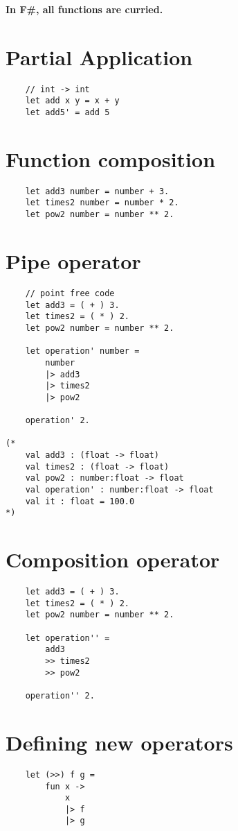 \documentclass[a4paper,11pt]{article}
\begin{document}
\textbf{In F\#, all functions are curried.}

\section{Partial Application}
\begin{lstlisting}
    // int -> int
    let add x y = x + y
    let add5' = add 5
\end{lstlisting}

\section{Function composition}
\begin{lstlisting}
    let add3 number = number + 3.
    let times2 number = number * 2.
    let pow2 number = number ** 2.
\end{lstlisting}


\section{Pipe operator}
\begin{lstlisting}
    // point free code 
    let add3 = ( + ) 3.
    let times2 = ( * ) 2.
    let pow2 number = number ** 2.
    
    let operation' number =
        number
        |> add3
        |> times2
        |> pow2
    
    operation' 2.
    
(*
    val add3 : (float -> float)
    val times2 : (float -> float)
    val pow2 : number:float -> float
    val operation' : number:float -> float
    val it : float = 100.0
*)
\end{lstlisting}

\section{Composition operator}
\begin{lstlisting}
    let add3 = ( + ) 3.
    let times2 = ( * ) 2.
    let pow2 number = number ** 2.
    
    let operation'' =
        add3
        >> times2
        >> pow2
    
    operation'' 2.
\end{lstlisting}

\section{Defining new operators}
\begin{lstlisting}
    let (>>) f g =
        fun x ->
            x
            |> f
            |> g
\end{lstlisting}
\end{document}
